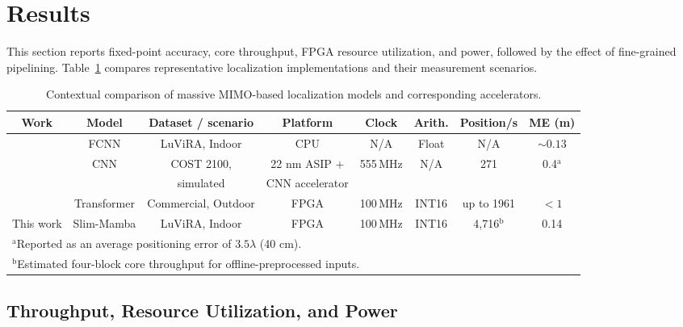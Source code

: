 \documentclass[lettersize,journal]{IEEEtran}
\begin{document}
\section{Results}
This section reports fixed-point accuracy, core throughput, FPGA resource
utilization, and power, followed by the effect of fine-grained pipelining.
Table~\ref{tab:accelerator_compare_tcas} compares representative localization
implementations and their measurement scenarios.

\begin{table}[!t]
\caption{Contextual comparison of massive MIMO-based localization models and corresponding accelerators.}
\label{tab:accelerator_compare_tcas}
\begin{center}
\footnotesize
\begin{tabular}{|c|c|c|c|c|c|c|c|} 
\hline
\textbf{Work} & \textbf{Model} & \textbf{Dataset / scenario} & \textbf{Platform} & \textbf{Clock} & \textbf{Arith.} & \textbf{Position/s} & \textbf{ME (m)} \\
\hline
\cite{LuViRAValidation2024} & FCNN & LuViRA, Indoor & CPU & N/A & Float & N/A & \(\sim 0.13\) \\ \hline
\cite{AttariISCAS2021} & CNN & COST 2100, & 22 nm ASIP + & 555\,MHz & N/A & 271 & 0.4$^{\mathrm{a}}$ \\  
&&simulated& CNN accelerator &&&&\\ \hline 
\cite{YamanTransformer2026} & Transformer & Commercial, Outdoor & FPGA & 100\,MHz & INT16 & up to 1961 & $<1$ \\ \hline
This work & Slim-Mamba & LuViRA, Indoor & FPGA & 100\,MHz & INT16 & 4,716$^{\mathrm{b}}$ & 0.14 \\ \hline
\multicolumn{8}{l}{$^{\mathrm{a}}$Reported as an average positioning error of $3.5\lambda$ (40 cm).}
\\
\multicolumn{8}{l}{$^{\mathrm{b}}$Estimated four-block core throughput for offline-preprocessed inputs.}
\end{tabular}
\end{center}
\end{table}

\subsection{Throughput, Resource Utilization, and Power}
\end{document}
